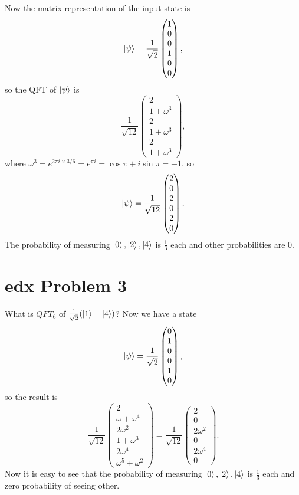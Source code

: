 \documentclass[10pt]{article}
\begin{document}
Now the matrix representation of the input state is
\[
\ket{\psi} = \frac{1}{\sqrt{2}} 
\begin{pmatrix}
1 \\ 0 \\ 0 \\ 1 \\ 0 \\ 0
\end{pmatrix},
\]
so the QFT of $\ket{\psi}$ is
\[
\frac{1}{\sqrt{12}}
\begin{pmatrix}
2 \\ 
1  + \omega^{3} \\
2 \\
1 + \omega^{3} \\
2 \\
1 + \omega^{3}
\end{pmatrix},
\]
where $\omega^{3} = e^{2\pi i \times 3 / 6} = e^{\pi i} = \cos \pi + i \sin \pi = -1$, so
\[
\ket{\psi} = \frac{1}{\sqrt{12}}
\begin{pmatrix}
2 \\ 0 \\2 \\ 0 \\2 \\ 0 
\end{pmatrix}.
\]
The probability of measuring $\ket{0}, \ket{2}, \ket{4}$ is $\frac{1}{3}$ each and other probabilities are 0.

\section*{edx Problem 3}
What is $QFT_6$ of $\frac{1}{\sqrt{2}} (\ket{1} + \ket{4})$? Now we have a state
\[
\ket{\psi} = \frac{1}{\sqrt{2}}
\begin{pmatrix}
0 \\
1 \\
0 \\
0 \\
1 \\
0
\end{pmatrix},
\]
so the result is
\[
\frac{1}{\sqrt{12}}
\begin{pmatrix}
2 \\
\omega + \omega^{4} \\
2\omega^{2} \\
1 + \omega^{3} \\
2\omega^{4} \\
\omega^{5} + \omega^{2}
\end{pmatrix}
= 
\frac{1}{\sqrt{12}}
\begin{pmatrix}
2 \\ 0 \\ 2 \omega^{2} \\ 0 \\ 2 \omega^4 \\ 0
\end{pmatrix}.
\]
Now it is easy to see that the probability of measuring $\ket{0}, \ket{2}, \ket{4}$ is $\frac{1}{3}$ each and zero probability of seeing other.
\end{document}
